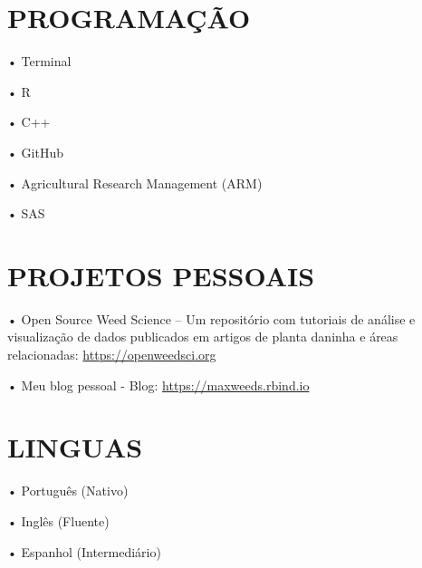 \documentclass[11pt,]{article}
\begin{document}
\hypertarget{programauxe7uxe3o}{%
\section{PROGRAMAÇÃO}\label{programauxe7uxe3o}}

• Terminal

• R

• C++

• GitHub

• Agricultural Research Management (ARM)

• SAS

\hypertarget{projetos-pessoais}{%
\section{PROJETOS PESSOAIS}\label{projetos-pessoais}}

• Open Source Weed Science -- Um repositório com tutoriais de análise e
visualização de dados publicados em artigos de planta daninha e áreas
relacionadas: \url{https://openweedsci.org}

• Meu blog pessoal - Blog: \url{https://maxweeds.rbind.io}

\hypertarget{linguas}{%
\section{LINGUAS}\label{linguas}}

• Português (Nativo)

• Inglês (Fluente)

• Espanhol (Intermediário)
\end{document}
